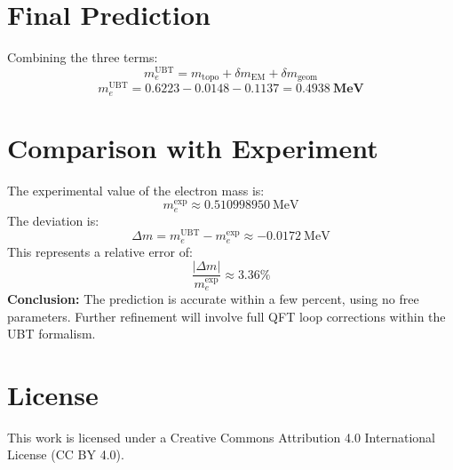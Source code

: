 \documentclass[12pt, a4paper]{article}
\begin{document}
\section{Final Prediction}
Combining the three terms:
\[
m_e^{\text{UBT}} = m_{\text{topo}} + \delta m_{\text{EM}} + \delta m_{\text{geom}} 
\]
\[
m_e^{\text{UBT}} = 0.6223 - 0.0148 - 0.1137 = \mathbf{0.4938~\text{MeV}}
\]

\section{Comparison with Experiment}
The experimental value of the electron mass is:
\[
m_e^{\text{exp}} \approx 0.510998950~\text{MeV}
\]
The deviation is:
\[
\Delta m = m_e^{\text{UBT}} - m_e^{\text{exp}} \approx -0.0172~\text{MeV}
\]
This represents a relative error of:
\[
\frac{|\Delta m|}{m_e^{\text{exp}}} \approx 3.36\%
\]
\textbf{Conclusion:} The prediction is accurate within a few percent, using no free parameters. Further refinement will involve full QFT loop corrections within the UBT formalism.


\section*{License}
This work is licensed under a Creative Commons Attribution 4.0 International License (CC BY 4.0).
\end{document}
